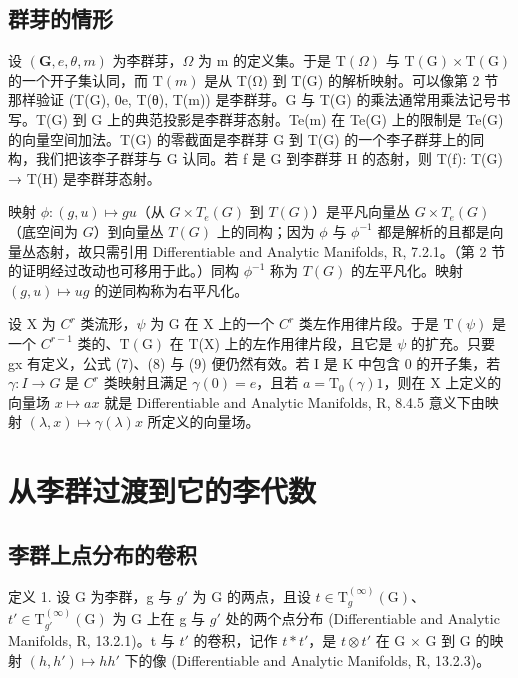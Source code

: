 \subsection{群芽的情形}

设 \((\mathbf{G}, e, \theta, m)\) 为李群芽，\(\Omega\) 为 m 的定义集。于是 \(\mathrm{T}(\Omega)\) 与 \(\mathrm{T}(\mathrm{G}) \times \mathrm{T}(\mathrm{G})\) 的一个开子集认同，而 \(\mathrm{T}(m)\) 是从 T(Ω) 到 T(G) 的解析映射。可以像第 2 节那样验证 (T(G), 0e, T(θ), T(m)) 是李群芽。G 与 T(G) 的乘法通常用乘法记号书写。T(G) 到 G 上的典范投影是李群芽态射。Te(m) 在 Te(G) 上的限制是 Te(G) 的向量空间加法。T(G) 的零截面是李群芽 G 到 T(G) 的一个李子群芽上的同构，我们把该李子群芽与 G 认同。若 f 是 G 到李群芽 H 的态射，则 T(f): T(G) → T(H) 是李群芽态射。

映射 \(\phi\colon(g,u)\mapsto gu\)（从 \(G\times T_{e}(G)\) 到 \(T(G)\)）是平凡向量丛 \(G\times T_{e}(G)\)（底空间为 \(G\)）到向量丛 \(T(G)\) 上的同构；因为 \(\phi\) 与 \(\phi^{-1}\) 都是解析的且都是向量丛态射，故只需引用 Differentiable and Analytic Manifolds, R, 7.2.1。（第 2 节的证明经过改动也可移用于此。）同构 \(\phi^{-1}\) 称为 \(T(G)\) 的左平凡化。映射 \((g,u)\mapsto ug\) 的逆同构称为右平凡化。

设 X 为 \(C^{r}\) 类流形，\(\psi\) 为 G 在 X 上的一个 \(C^{r}\) 类左作用律片段。于是 \(\mathrm{T}(\psi)\) 是一个 \(C^{r-1}\) 类的、\(\mathrm{T}(\mathrm{G})\) 在 T(X) 上的左作用律片段，且它是 \(\psi\) 的扩充。只要 gx 有定义，公式 (7)、(8) 与 (9) 便仍然有效。若 I 是 K 中包含 0 的开子集，若 \(\gamma: I \to G\) 是 \(C^{r}\) 类映射且满足 \(\gamma(0) = e\)，且若 \(a = \mathrm{T}_{0}(\gamma)1\)，则在 X 上定义的向量场 \(x \mapsto ax\) 就是 Differentiable and Analytic Manifolds, R, 8.4.5 意义下由映射 \((\lambda, x) \mapsto \gamma(\lambda)x\) 所定义的向量场。

\section{从李群过渡到它的李代数}

\subsection{李群上点分布的卷积}

定义 1. 设 G 为李群，g 与 \(g'\) 为 G 的两点，且设 \(t \in \mathrm{T}_{g}^{(\infty)}(\mathrm{G})\)、\(t' \in \mathrm{T}_{g'}^{(\infty)}(\mathrm{G})\) 为 G 上在 g 与 \(g'\) 处的两个点分布 (Differentiable and Analytic Manifolds, R, 13.2.1)。t 与 \(t'\) 的卷积，记作 \(t * t'\)，是 \(t \otimes t'\) 在 G × G 到 G 的映射 \((h, h') \mapsto hh'\) 下的像 (Differentiable and Analytic Manifolds, R, 13.2.3)。

